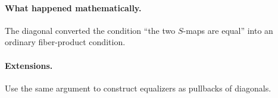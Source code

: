 \paragraph{What happened mathematically.}
The diagonal converted the condition ``the two $S$-maps are equal'' into an ordinary fiber-product condition.

\paragraph{Extensions.}
Use the same argument to construct equalizers as pullbacks of diagonals.
\fi
